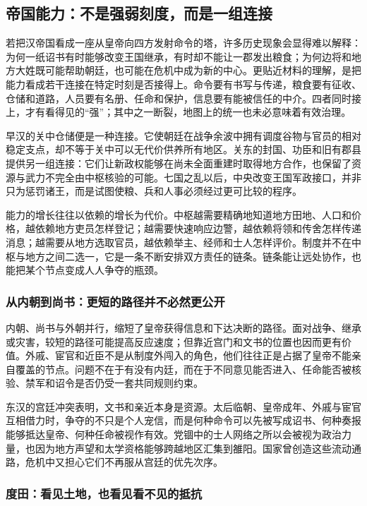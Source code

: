 \subsection{帝国能力：不是强弱刻度，而是一组连接}
\label{sec:synthesis-capacity}

若把汉帝国看成一座从皇帝向四方发射命令的塔，许多历史现象会显得难以解释：为何一纸诏书有时能够改变王国继承，有时却不能让一郡发出粮食；为何边将和地方大姓既可能帮助朝廷，也可能在危机中成为新的中心。更贴近材料的理解，是把能力看成若干连接在特定时刻是否接得上。命令要有书写与传递，粮食要有征收、仓储和道路，人员要有名册、任命和保护，信息要有能被信任的中介。四者同时接上，才有看得见的“强”；其中之一断裂，地图上的统一也未必意味着有效治理。

早汉的关中仓储便是一种连接。它使朝廷在战争余波中拥有调度谷物与官员的相对稳定支点，却不等于关中可以无代价供养所有地区。关东的封国、功臣和旧有郡县提供另一组连接：它们让新政权能够在尚未全面重建时取得地方合作，也保留了资源与武力不完全由中枢核验的可能。七国之乱以后，中央改变王国军政接口，并非只为惩罚诸王，而是试图使粮、兵和人事必须经过更可比较的程序。

能力的增长往往以依赖的增长为代价。中枢越需要精确地知道地方田地、人口和价格，越依赖地方吏员怎样登记；越需要快速响应边警，越依赖将领和传舍怎样传递消息；越需要从地方选取官员，越依赖举主、经师和士人怎样评价。制度并不在中枢与地方之间二选一，它是一条不断安排双方责任的链条。链条能让远处协作，也能把某个节点变成人人争夺的瓶颈。

\subsubsection{从内朝到尚书：更短的路径并不必然更公开}

内朝、尚书与外朝并行，缩短了皇帝获得信息和下达决断的路径。面对战争、继承或灾害，较短的路径可能提高反应速度；但靠近宫门和文书的位置也因而更有价值。外戚、宦官和近臣不是从制度外闯入的角色，他们往往正是占据了皇帝不能亲自覆盖的节点。问题不在于有没有内廷，而在于不同意见能否进入、任命能否被核验、禁军和诏令是否仍受一套共同规则约束。

东汉的宫廷冲突表明，文书和亲近本身是资源。太后临朝、皇帝成年、外戚与宦官互相借力时，争夺的不只是个人宠信，而是何种命令可以先被写成诏书、何种奏报能够抵达皇帝、何种任命被视作有效。党锢中的士人网络之所以会被视为政治力量，也因为地方声望和太学资格能够跨越地区汇集到雒阳。国家曾创造这些流动通路，危机中又担心它们不再服从宫廷的优先次序。

\subsubsection{度田：看见土地，也看见看不见的抵抗}

